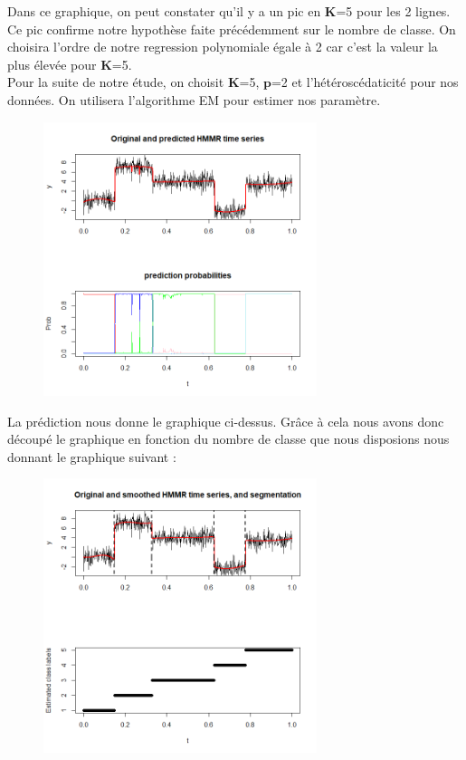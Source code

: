 \documentclass[11pt]{article}
\newcommand{\bsp}{\boldsymbol{p}}
\newcommand{\bK}{\mathbf{K}}
\begin{document}
Dans ce graphique, on peut constater qu'il y a un pic en $\bK$=5 pour les 2 lignes. Ce pic confirme notre hypothèse faite précédemment sur le nombre de classe. On choisira l'ordre de notre regression polynomiale égale à 2 car c'est la valeur la plus élevée pour $\bK$=5.\\

Pour la suite de notre étude, on choisit $\bK$=5, $\bsp$=2 et l'hétéroscédaticité pour nos données. On utilisera l'algorithme EM pour estimer nos paramètre.\\

\begin{figure}[h]
\begin{center}
\includegraphics[height=8cm]{prediction.png}
\end{center}
\end{figure}

La prédiction nous donne le graphique ci-dessus. Grâce à cela nous avons donc découpé le graphique en fonction du nombre de classe que nous disposions nous donnant le graphique suivant : \\

\begin{figure}[h]
\begin{center}
\includegraphics[height=8cm]{separationclasse.png}
\end{center}
\end{figure}
\end{document}
